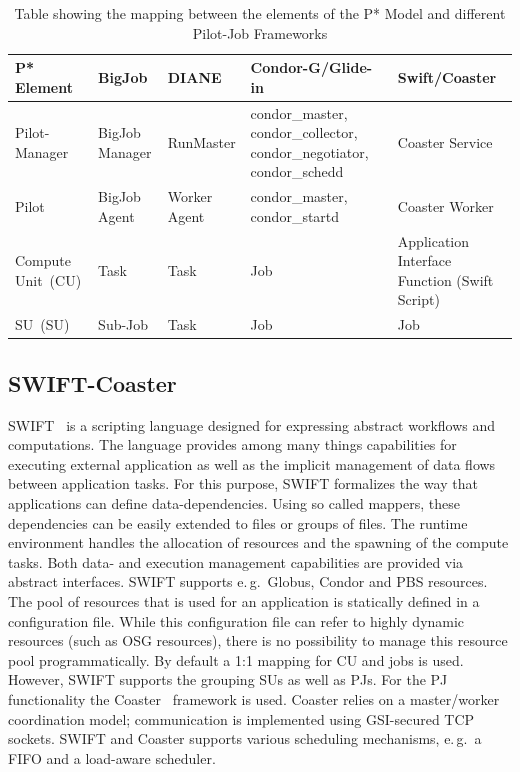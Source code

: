\documentclass[conference,final]{IEEEtran}
\newcommand{\pilot}{Pilot\xspace}
\newcommand{\computeunit}{Compute Unit\xspace}
\newcommand{\cu}{CU\xspace}
\newcommand{\su}{SU\xspace}
\newcommand{\upp}{\vspace*{-0.5em}}
\begin{document}
\begin{table}[t]
\centering
\begin{tabular}{|p{2.5cm}|p{3cm}|p{3cm}|p{3cm}|p{3cm}|}
  \hline
  \textbf{P* Element} &\textbf{BigJob} &\textbf{DIANE} &\textbf{Condor-G/Glide-in} &\textbf{Swift/Coaster}  \\
  \hline
  Pilot-Manager &BigJob Manager & RunMaster & condor\_master, condor\_collector, condor\_negotiator, condor\_schedd &Coaster Service\\ 
  \hline
  \pilot &BigJob Agent  & Worker Agent &condor\_master, condor\_startd &Coaster Worker\\
  \hline
  \computeunit  \ (CU) &Task &Task &Job &Application Interface Function (Swift Script)\\
  \hline
  \su \ (SU) &Sub-Job &Task &Job &Job\\
\hline
\end{tabular}
\caption{Table showing the mapping between the elements of the P* Model and different Pilot-Job Frameworks\upp\upp} \label{table:bigjob-saga-diane}
\end{table}




\upp
\subsection{SWIFT-Coaster\upp\upp}

SWIFT~\cite{Wilde2011} is a scripting language designed for expressing
abstract workflows and computations. The language provides among many
things capabilities for executing external application as well as the
implicit management of data flows between application tasks. For this
purpose, SWIFT formalizes the way that applications can define
data-dependencies. Using so called mappers, these dependencies can be
easily extended to files or groups of files. The runtime environment
handles the allocation of resources and the spawning of the compute
tasks. Both data- and execution management capabilities are provided
via abstract interfaces. SWIFT supports e.\,g.\ Globus, Condor and PBS
resources.  The pool of resources that is used for an application is
statically defined in a configuration file. While this configuration
file can refer to highly dynamic resources (such as OSG resources),
there is no possibility to manage this resource pool
programmatically. By default a 1:1 mapping for \cu and jobs is
used. However, SWIFT supports the grouping SUs as well as PJs. For the
PJ functionality the Coaster~\cite{coasters} framework is
used. Coaster relies on a master/worker coordination model;
communication is implemented using GSI-secured TCP sockets. SWIFT and
Coaster supports various scheduling mechanisms, e.\,g.\ a FIFO and a
load-aware scheduler.
\end{document}
